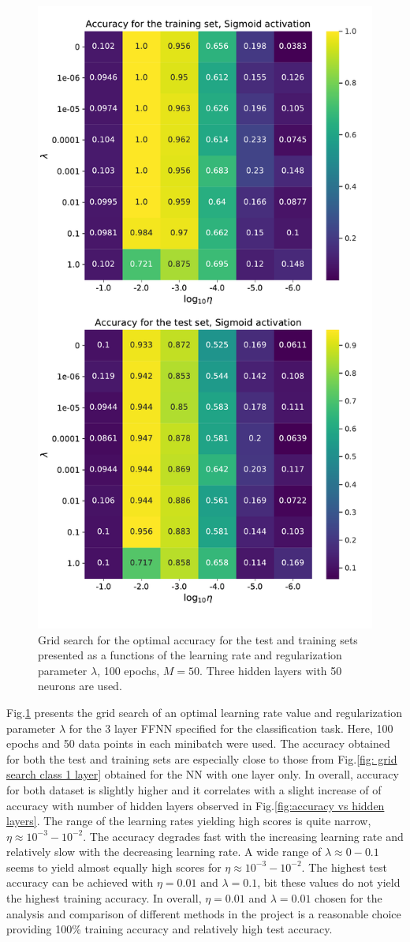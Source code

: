 \documentclass{emulateapj}
\begin{document}
\begin{figure}[!ht]
    \centering
    \includegraphics[width=.49\textwidth]{Figures/Class_Ridge.pdf}
    \caption{Grid search for the optimal accuracy for the test and training sets presented as a functions of the learning rate and regularization parameter $\lambda$, 100 epochs, $M=50$. Three hidden layers with 50 neurons are used.}
    \label{fig: grid search class 3 layer}
\end{figure}

Fig.\ref{fig: grid search class 3 layer} presents the grid search of an optimal learning rate value and regularization parameter $\lambda$ for the 3 layer FFNN specified for the classification task. Here, 100 epochs and 50 data points in each minibatch were used. The accuracy obtained for both the test and training sets are especially close to those from Fig.\ref{fig: grid search class 1 layer} obtained for the NN with one layer only. In overall, accuracy for both dataset is slightly higher and it correlates with a slight increase of of accuracy with number of hidden layers observed in Fig.\ref{fig:accuracy vs hidden layers}. The range of the learning rates yielding high scores is quite narrow, $\eta\approx10^{-3}-10^{-2}$. The accuracy degrades fast with the increasing learning rate and relatively slow with the decreasing learning rate. A wide range of $\lambda\approx0-0.1$ seems to yield almost equally high scores for $\eta\approx10^{-3}-10^{-2}$. The highest test accuracy can be achieved with $\eta=0.01$ and $\lambda=0.1$, bit these values do not yield the highest training accuracy. In overall, $\eta=0.01$ and $\lambda=0.01$ chosen for the analysis and comparison of different methods in the project is a reasonable choice providing 100\% training accuracy and relatively high test accuracy. 
\end{document}

